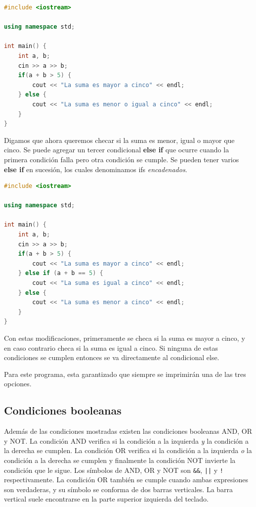 \documentclass{article}
\begin{document}
\begin{lstlisting}[language=C++, title=Else]
#include <iostream>

using namespace std;

int main() {
	int a, b;
	cin >> a >> b;
	if(a + b > 5) {
		cout << "La suma es mayor a cinco" << endl;
	} else {
		cout << "La suma es menor o igual a cinco" << endl;
	}
}
\end{lstlisting}

Digamos que ahora queremos checar si la suma es menor, igual o mayor que cinco. Se puede agregar un tercer condicional \textbf{else if} que ocurre cuando la primera condición falla pero otra condición se cumple. Se pueden tener varios \textbf{else if} en sucesión, los cuales denominamos ifs \textit{encadenados}.

\begin{lstlisting}[language=C++, title=Else if]
#include <iostream>

using namespace std;

int main() {
	int a, b;
	cin >> a >> b;
	if(a + b > 5) {
		cout << "La suma es mayor a cinco" << endl;
	} else if (a + b == 5) {
		cout << "La suma es igual a cinco" << endl;
	} else {
		cout << "La suma es menor a cinco" << endl;
	}
}
\end{lstlisting}

Con estas modificaciones, primeramente se checa si la suma es mayor a cinco, y en caso contrario checa si la suma es igual a cinco. Si ninguna de estas condiciones se cumplen entonces se va directamente al condicional else.

Para este programa, esta garantizado que siempre se imprimirán una de las tres opciones.

\subsection{Condiciones booleanas}

Además de las condiciones mostradas existen las condiciones booleanas AND, OR y NOT. La condición AND verifica si la condición a la izquierda \textit{y} la condición a la derecha se cumplen. La condición OR verifica si la condición a la izquierda \textit{o} la condición a la derecha se cumplen y finalmente la condición NOT invierte la condición que le sigue. Los símbolos de AND, OR y NOT son \lstinline{&&}, \lstinline{||} y \lstinline{!} respectivamente. La condición OR también se cumple cuando ambas expresiones son verdaderas, y su símbolo se conforma de dos barras verticales. La barra vertical suele encontrarse en la parte superior izquierda del teclado.
\end{document}
